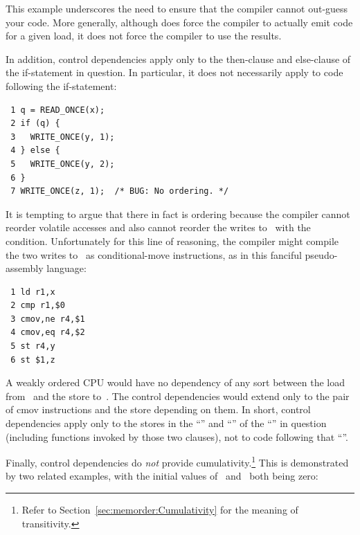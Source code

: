 This example underscores the need to ensure that the compiler cannot
out-guess your code.
More generally, although  does force
the compiler to actually emit code for a given load, it does not force
the compiler to use the results.

In addition, control dependencies apply only to the then-clause and
else-clause of the if-statement in question.
In particular, it does
not necessarily apply to code following the if-statement:

\vspace{5pt}
\begin{minipage}[t]{\columnwidth}
\scriptsize
\begin{verbatim}
 1 q = READ_ONCE(x);
 2 if (q) {
 3   WRITE_ONCE(y, 1);
 4 } else {
 5   WRITE_ONCE(y, 2);
 6 }
 7 WRITE_ONCE(z, 1);  /* BUG: No ordering. */
\end{verbatim}
\end{minipage}
\vspace{5pt}

It is tempting to argue that there in fact is ordering because the
compiler cannot reorder volatile accesses and also cannot reorder
the writes to~ with the condition.
Unfortunately for this line
of reasoning, the compiler might compile the two writes to~ as
conditional-move instructions, as in this fanciful pseudo-assembly
language:

\vspace{5pt}
\begin{minipage}[t]{\columnwidth}
\scriptsize
\begin{verbatim}
 1 ld r1,x
 2 cmp r1,$0
 3 cmov,ne r4,$1
 4 cmov,eq r4,$2
 5 st r4,y
 6 st $1,z
\end{verbatim}
\end{minipage}
\vspace{5pt}

A weakly ordered CPU would have no dependency of any sort between the load
from~ and the store to~.
The control dependencies would extend
only to the pair of cmov instructions and the store depending on them.
In short, control dependencies apply only to the stores in the ``''
and ``'' of the ``'' in question (including functions
invoked by those two clauses), not to code following that ``''.

Finally, control dependencies do \emph{not} provide cumulativity.\footnote{
	Refer to Section~\ref{sec:memorder:Cumulativity} for
	the meaning of transitivity.}
This is demonstrated by two related examples, with the initial values
of~ and~ both being zero:

